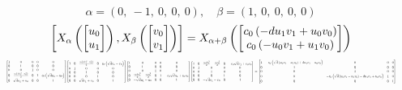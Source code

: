 \documentclass[11pt]{article}
\theoremstyle{definition}
\begin{document}
\[
\alpha = \left( 0, \  -1, \  0, \  0, \  0\right), \quad \beta = \left( 1, \  0, \  0, \  0, \  0\right)
\]
\[
\scaletoalign{\textwidth}{\left[ X_{\alpha}\left(\left[\begin{matrix}u_{0}\\u_{1}\end{matrix}\right]\right), X_{\beta}\left(\left[\begin{matrix}v_{0}\\v_{1}\end{matrix}\right]\right) \right] = X_{\alpha + \beta}\left(\left[\begin{matrix}c_{0} \left(- d u_{1} v_{1} + u_{0} v_{0}\right)\\c_{0} \left(- u_{0} v_{1} + u_{1} v_{0}\right)\end{matrix}\right]\right)}
\]
\[
\scaletoalign{\textwidth}{{\left[\begin{matrix}1 & 0 & 0 & 0 & 0\\0 & 1 & 0 & 0 & 0\\0 & 0 & 1 & 0 & 0\\0 & \frac{c_{0} \left(d u_{1}^{2} - u_{0}^{2}\right)}{2} & 0 & 1 & c_{0} \left(\sqrt{d} u_{1} - u_{0}\right)\\0 & \sqrt{d} u_{1} + u_{0} & 0 & 0 & 1\end{matrix}\right]} {\left[\begin{matrix}1 & 0 & \frac{c_{0} \left(d v_{1}^{2} - v_{0}^{2}\right)}{2} & 0 & c_{0} \left(\sqrt{d} v_{1} - v_{0}\right)\\0 & 1 & 0 & 0 & 0\\0 & 0 & 1 & 0 & 0\\0 & 0 & 0 & 1 & 0\\0 & 0 & \sqrt{d} v_{1} + v_{0} & 0 & 1\end{matrix}\right]} {\left[\begin{matrix}1 & 0 & 0 & 0 & 0\\0 & 1 & 0 & 0 & 0\\0 & 0 & 1 & 0 & 0\\0 & \frac{c_{0} d u_{1}^{2}}{2} - \frac{c_{0} u_{0}^{2}}{2} & 0 & 1 & - c_{0} \sqrt{d} u_{1} + c_{0} u_{0}\\0 & - \sqrt{d} u_{1} - u_{0} & 0 & 0 & 1\end{matrix}\right]} {\left[\begin{matrix}1 & 0 & \frac{c_{0} d v_{1}^{2}}{2} - \frac{c_{0} v_{0}^{2}}{2} & 0 & - c_{0} \sqrt{d} v_{1} + c_{0} v_{0}\\0 & 1 & 0 & 0 & 0\\0 & 0 & 1 & 0 & 0\\0 & 0 & 0 & 1 & 0\\0 & 0 & - \sqrt{d} v_{1} - v_{0} & 0 & 1\end{matrix}\right]} = {\left[\begin{matrix}1 & - c_{0} \left(\sqrt{d} \left(u_{0} v_{1} - u_{1} v_{0}\right) + d u_{1} v_{1} - u_{0} v_{0}\right) & 0 & 0 & 0\\0 & 1 & 0 & 0 & 0\\0 & 0 & 1 & 0 & 0\\0 & 0 & - c_{0} \left(\sqrt{d} \left(u_{0} v_{1} - u_{1} v_{0}\right) - d u_{1} v_{1} + u_{0} v_{0}\right) & 1 & 0\\0 & 0 & 0 & 0 & 1\end{matrix}\right]}}
\]
\end{document}
